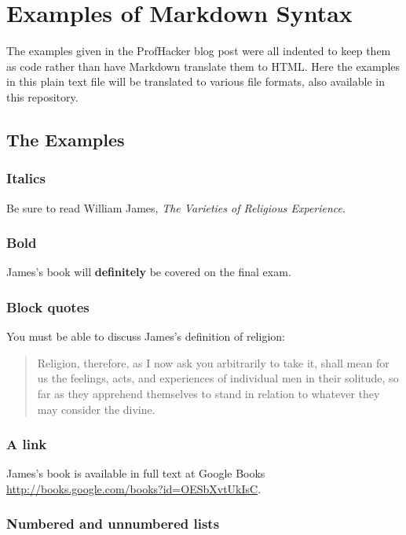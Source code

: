 \section{Examples of Markdown Syntax}

The examples given in the ProfHacker blog post were all indented to keep
them as code rather than have Markdown translate them to HTML. Here the
examples in this plain text file will be translated to various file
formats, also available in this repository.

\subsection{The Examples}

\subsubsection{Italics}

Be sure to read William James, \emph{The Varieties of Religious
Experience}.

\subsubsection{Bold}

James's book will \textbf{definitely} be covered on the final exam.

\subsubsection{Block quotes}

You must be able to discuss James's definition of religion:

\begin{quote}
Religion, therefore, as I now ask you arbitrarily to take it, shall mean
for us the feelings, acts, and experiences of individual men in their
solitude, so far as they apprehend themselves to stand in relation to
whatever they may consider the divine.

\end{quote}
\subsubsection{A link}

James's book is available in full text at Google Books
\url{http://books.google.com/books?id=OESbXvtUkIsC}.

\subsubsection{Numbered and unnumbered lists}

